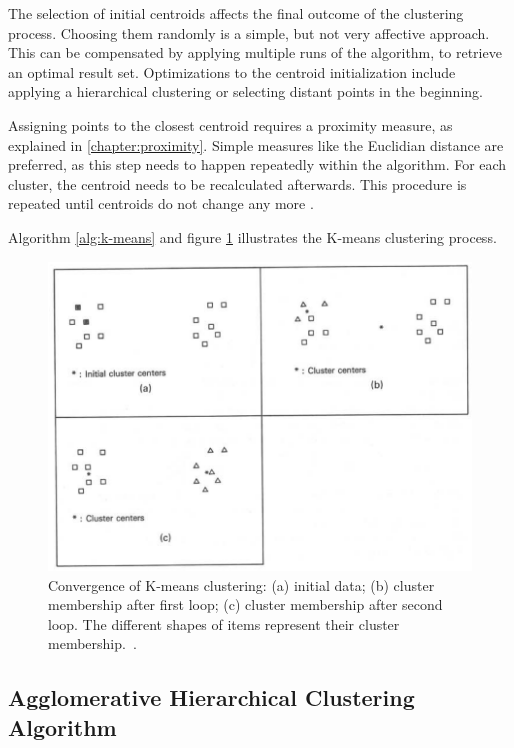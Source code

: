 The selection of initial centroids affects the final outcome of the clustering process. Choosing them randomly is a simple, but not very affective approach. This can be compensated by applying multiple runs of the algorithm, to retrieve an optimal result set. Optimizations to the centroid initialization include applying a hierarchical clustering or selecting distant points in the beginning.

Assigning points to the closest centroid requires a proximity measure, as explained in \ref{chapter:proximity}. Simple measures like the Euclidian distance are preferred, as this step needs to happen repeatedly within the algorithm. For each cluster, the centroid needs to be recalculated afterwards. This procedure is repeated until centroids do not change any more \cite{Jain99clusterreview, Meert06clustermaps}.

Algorithm \ref{alg:k-means} and figure \ref{fig:clustering_k-means} illustrates the K-means clustering process.

\begin{figure}[h]
  \begin{center}
    \includegraphics[width=1\textwidth]{figures/clustering_k-means.png}
    \caption{Convergence of K-means clustering: (a) initial data; (b) cluster membership after first loop; (c) cluster membership after second loop. The different shapes of items represent their cluster membership.~\cite[p 99]{Jain88clustering}.}
    \label{fig:clustering_k-means}
  \end{center}
\end{figure}

\FloatBarrier
\subsection{Agglomerative Hierarchical Clustering Algorithm}
\label{chapter:clustering-hierarchical}

